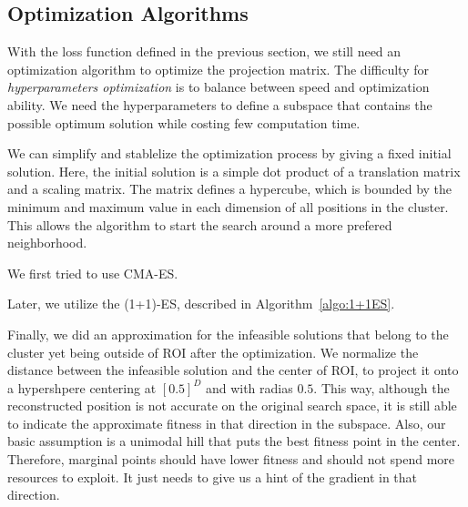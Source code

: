 




\subsection{Optimization Algorithms}

With the loss function defined in the previous section, 
we still need an optimization algorithm to optimize the projection matrix.
The difficulty for \textit{hyperparameters optimization} is to balance between speed and optimization ability.
We need the hyperparameters to define a subspace that contains the possible optimum solution while costing few computation time.

We can simplify and stablelize the optimization process by giving a fixed initial solution.
Here, the initial solution is a simple dot product of a translation matrix and a scaling matrix. 
The matrix defines a hypercube, which is bounded by the minimum and maximum value in each dimension of all positions in the cluster.
This allows the algorithm to start the search around a more prefered neighborhood.

We first tried to use CMA-ES.

Later, we utilize the (1+1)-ES, described in Algorithm~\ref{algo:1+1ES}.

Finally, we did an approximation for the infeasible solutions that belong to the cluster yet being outside of ROI after the optimization.
We normalize the distance between the infeasible solution and the center of ROI,
to project it onto a hypershpere centering at $[0.5]^D$ and with radias $0.5$.
This way, although the reconstructed position is not accurate on the original search space,
it is still able to indicate the approximate fitness in that direction in the subspace.
Also, our basic assumption is a unimodal hill that puts the best fitness point in the center.
Therefore, marginal points should have lower fitness and should not spend more resources to exploit.
It just needs to give us a hint of the gradient in that direction.
